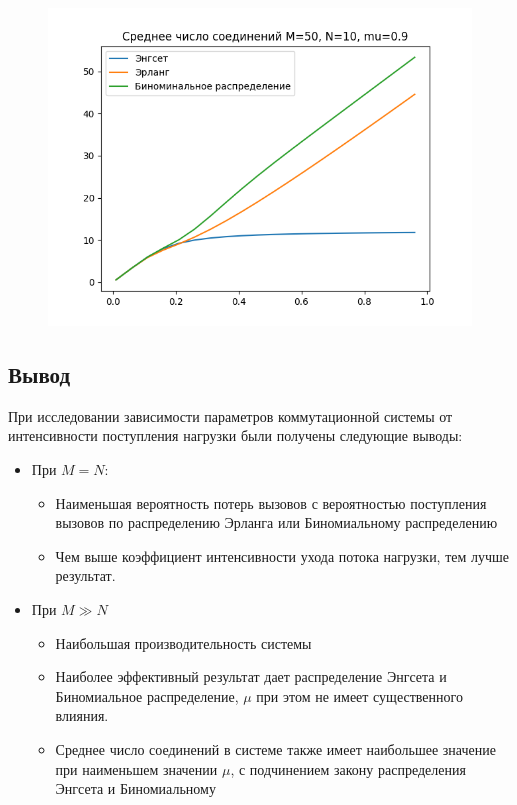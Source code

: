 \documentclass[12pt]{article}
\let\Oldsubsection\subsection
\renewcommand{\subsection}{\FloatBarrier\Oldsubsection}
\begin{document}
\begin{figure}[!htb]
\centering
\includegraphics[scale=1.00]{assets/iss_1/aver_conn_M50_N10_mu09.png}
\caption{}
\label{}
\end{figure}

\subsection{Вывод}
При исследовании зависимости параметров коммутационной системы от интенсивности поступления нагрузки были получены следующие выводы:
\begin{itemize}
	\item При $M = N$:
	\begin{itemize}
		\item Наименьшая вероятность потерь вызовов с вероятностью поступления вызовов по распределению Эрланга или Биномиальному распределению
		\item Чем выше коэффициент интенсивности ухода потока нагрузки, тем лучше результат.
	\end{itemize}
	\item При $ M ≫ N$
		\begin{itemize}
			\item Наибольшая производительность системы
			\item Наиболее эффективный результат дает распределение Энгсета и Биномиальное распределение, $\mu$ при этом не имеет существенного влияния.
			\item Среднее число соединений в  системе также имеет наибольшее значение при наименьшем значении $\mu$, с подчинением закону распределения Энгсета и Биномиальному
		\end{itemize}
\end{itemize}
\end{document}

